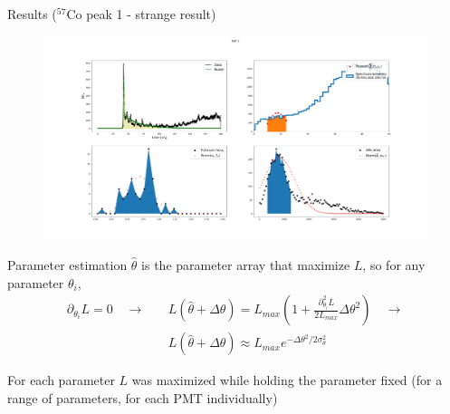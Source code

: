 \documentclass{beamer}
\begin{document}
\begin{frame}{Results ($^{57}$Co peak 1 - strange result)}
\begin{figure}[h]
\includegraphics[width=1\linewidth]{wird.png}
\end{figure}
\end{frame}

\begin{frame}{Parameter estimation}
$\hat{\theta}$ is the parameter array that maximize $L$, so for any parameter $\theta_i$, 
\begin{equation}
\begin{split}
\partial_{\theta_i}L=0 \quad \rightarrow\quad &L(\hat{\theta}+\Delta\theta)=L_{max}(1+\frac{\partial^2_{\theta_i}L}{2L_{max}}\Delta\theta^2) \quad
\rightarrow\\
&L(\hat{\theta}+\Delta\theta)\approx L_{max}e^{-\Delta\theta^2/2\sigma^2_{\theta}}
\end{split}
\end{equation}
\end{frame}

\begin{frame}
For each parameter $L$ was maximized while holding the parameter fixed (for a range of parameters, for each PMT individually)
\end{frame}
\end{document}
